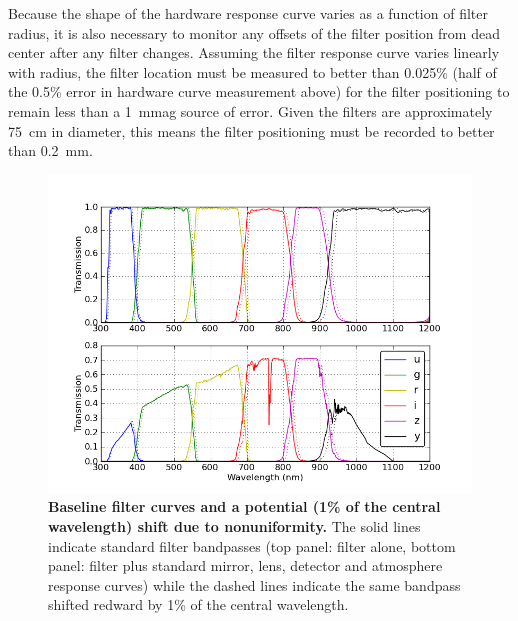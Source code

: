 \documentclass[12pt,preprint]{aastex}
\begin{document}
Because the shape of the hardware response curve varies as a function
of filter radius, it is also necessary to monitor any offsets of the
filter position from dead center after any filter changes. Assuming
the filter response curve varies linearly with radius, the filter
location must be measured to better than 0.025\% (half of the 0.5\%
error in hardware curve measurement above) for the filter
positioning to remain less than a 1~mmag source of error.  Given the filters are approximately
75~cm in diameter, this means the filter positioning must be recorded
to better than 0.2~mm.


\begin{figure}
\centering
\includegraphics[width=6in]{filter_shifts}
\caption{{\small 
{\bf Baseline filter curves and a potential (1\% of the central
  wavelength) shift due to nonuniformity.}
The solid lines indicate standard filter bandpasses (top panel: filter
alone, bottom panel: filter plus standard mirror, lens, detector and atmosphere
response curves) while the dashed lines indicate the same bandpass
shifted redward by 1\% of the central wavelength.}}
\label{fig:filtershift}
\end{figure}
\end{document}

